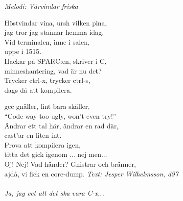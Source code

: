 {\footnotesize\textit{Melodi: Vårvindar friska}}\par
\vspace{10pt}
Höstvindar vina, ursh vilken pina,\\
jag tror jag stannar hemma idag.\\
Vid terminalen, inne i salen,\\
uppe i 1515.\\
Hackar på SPARC:en, skriver i C,\\
minneshantering, vad är nu det?\\
Trycker ctrl-x, trycker ctrl-s,\\
dags då att kompilera.\par
\vspace{10pt}
gcc gnäller, lint bara skäller,\\
``Code way too ugly, won't even try!''\\
Ändrar ett tal här, ändrar en rad där,\\
cast'ar en liten int.\\
Prova att kompilera igen,\\
titta det gick igenom ... nej men...\\
Oj! Nej! Vad händer? Gnistrar och bränner,\\
ajdå, vi fick en core-dump.
\vspace{10pt}
{\footnotesize\textit{Text: Jesper Wilhelmsson, d97\\ \\ Ja, jag vet
    att det ska vara C-x...}}
